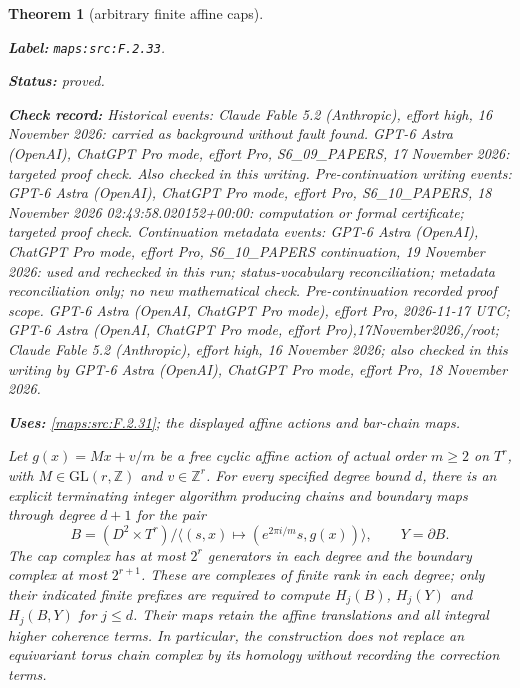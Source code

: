 \documentclass[11pt,a4paper]{article}
\newtheorem{theorem}{Theorem}[section]
\theoremstyle{definition}
\newcommand{\StatementRecord}[4]{\par\smallskip\begingroup\upshape\raggedright\noindent\textbf{Label:} \nolinkurl{#1}.\par\noindent\textbf{Status:} #2.\par\noindent\textbf{Check record:} #3.\par\noindent\textbf{Uses:} #4.\par\endgroup\smallskip}
\begin{document}
\begin{theorem}[arbitrary finite affine caps]\label{maps:src:F.2.33}
\StatementRecord{maps:src:F.2.33}{proved}{Historical events: Claude Fable 5.2 (Anthropic), effort high, 16 November 2026: carried as background without fault found. GPT-6 Astra (OpenAI), ChatGPT Pro mode, effort Pro, S6\_09\_PAPERS, 17 November 2026: targeted proof check. Also checked in this writing. Pre-continuation writing events: GPT-6 Astra (OpenAI), ChatGPT Pro mode, effort Pro, S6\_10\_PAPERS, 18 November 2026 02:43:58.020152+00:00: computation or formal certificate; targeted proof check. Continuation metadata events: GPT-6 Astra (OpenAI), ChatGPT Pro mode, effort Pro, S6\_10\_PAPERS continuation, 19 November 2026: used and rechecked in this run; status-vocabulary reconciliation; metadata reconciliation only; no new mathematical check. \emph{Pre-continuation recorded proof scope.} GPT-6 Astra (OpenAI, ChatGPT Pro mode), effort Pro, 2026-11-17 UTC; GPT-6 Astra (OpenAI, ChatGPT Pro mode, effort Pro),17November2026,/root; Claude Fable 5.2 (Anthropic), effort high, 16 November 2026; also checked in this writing by GPT-6 Astra (OpenAI), ChatGPT Pro mode, effort Pro, 18 November 2026}{\cref{maps:src:F.2.31}; the displayed affine actions and bar-chain maps}


Let $g(x)=Mx+v/m$ be a free cyclic affine action of actual order
$m\geq2$ on $T^r$, with $M\in\mathrm{GL}(r,\mathbb Z)$ and
$v\in\mathbb Z^r$.  For every specified degree bound $d$, there is
an explicit terminating integer algorithm producing chains and
boundary maps through degree $d+1$ for the pair
\[
 B=(D^2\times T^r)/\langle(s,x)\mapsto
 (e^{2\pi i/m}s,g(x))\rangle,
 \qquad Y=\partial B.                                      \tag{F.CA1}\label{maps:eq:F.CA1}
\]
The cap complex has at most $2^r$ generators in each degree and
the boundary complex at most $2^{r+1}$.  These are complexes of
finite rank in each degree; only their indicated finite prefixes
are required to compute $H_j(B)$, $H_j(Y)$ and $H_j(B,Y)$ for
$j\leq d$.  Their maps retain the affine translations and all
integral higher coherence terms.  In particular, the construction
does not replace an equivariant torus chain complex by its
homology without recording the correction terms.

\end{theorem}
\end{document}
